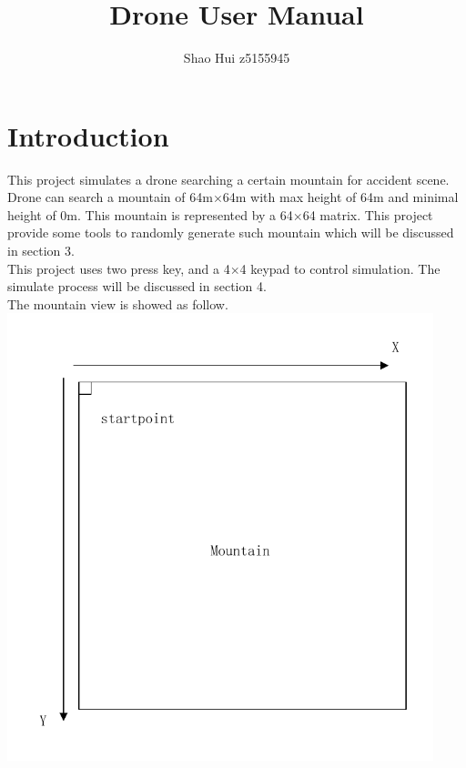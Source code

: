 \documentclass[a4paper, 12 pt]{report}
\begin{document}
\title{Drone User Manual}
\author{Shao Hui z5155945}
\date{}
\maketitle
\pagestyle{empty}
\setcounter{section}{0}
\tableofcontents
\newpage

\section{Introduction}
This project simulates a drone searching a certain mountain for accident scene.\\
Drone can search a mountain of 64m$\times$64m with max height of 64m and minimal height of 0m.
This mountain is represented by a 64$\times$64 matrix. This project provide some tools to randomly generate such mountain which will be discussed in section 3.\\
This project uses two press key, and a 4$\times$4 keypad to control simulation. The simulate process will be discussed in section 4.\\
The mountain view is showed as follow.\\
\includegraphics[height = 130mm]{mountain_diagram.pdf}
\newpage
\end{document}
